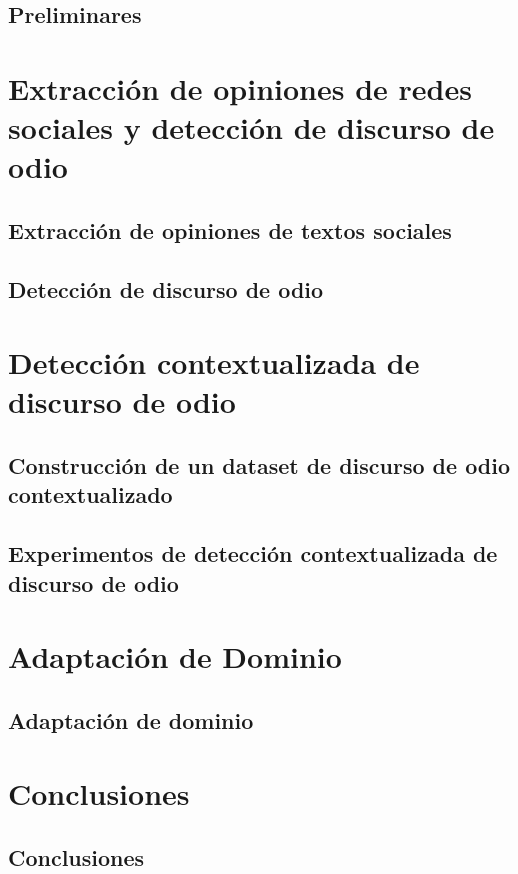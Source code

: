 \documentclass[11pt,a4paper,twoside]{tesis}
\begin{document}
\chapter{Preliminares}

\part{Extracción de opiniones de redes sociales y detección de discurso de odio}
%
\chapter{Extracción de opiniones de textos sociales}

%
\chapter{Detección de discurso de odio}

%
% 
\part{Detección contextualizada de discurso de odio}
%
\chapter{Construcción de un dataset de discurso de odio contextualizado}

%
\chapter{Experimentos de detección contextualizada de discurso de odio}

%

\part{Adaptación de Dominio}

\chapter{Adaptación de dominio}

%
\part*{Conclusiones}
\chapter{Conclusiones}
%

%
\appendix
%





\backmatter

\end{document}

